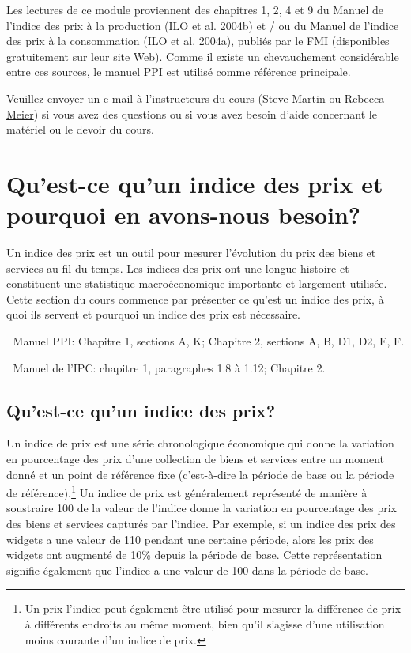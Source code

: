 \documentclass[]{article}
\begin{document}
Les lectures de ce module proviennent des chapitres 1, 2, 4 et 9 du Manuel de l'indice des prix à la production (ILO et al. 2004b) et / ou du Manuel de l'indice des prix à la consommation (ILO et al. 2004a), publiés par le FMI (disponibles gratuitement sur leur site Web). Comme il existe un chevauchement considérable entre ces sources, le manuel PPI est utilisé comme référence principale.

Veuillez envoyer un e-mail à l'instructeurs du cours (\href{mailto:steve.martin5@canada.ca}{Steve Martin} ou \href{mailto:rebecca.meier@canada.ca}{Rebecca Meier}) si vous avez des questions ou si vous avez besoin d'aide concernant le matériel ou le devoir du cours.

\hypertarget{quest-ce-quun-indice-des-prix-et-pourquoi-en-avons-nous-besoin}{%
\section{Qu'est-ce qu'un indice des prix et pourquoi en avons-nous besoin?}\label{quest-ce-quun-indice-des-prix-et-pourquoi-en-avons-nous-besoin}}

Un indice des prix est un outil pour mesurer l'évolution du prix des biens et services au fil du temps. Les indices des prix ont une longue histoire et constituent une statistique macroéconomique importante et largement utilisée. Cette section du cours commence par présenter ce qu'est un indice des prix, à quoi ils servent et pourquoi un indice des prix est nécessaire.

📖 Manuel PPI: Chapitre 1, sections A, K; Chapitre 2, sections A, B, D1, D2, E, F.

📖 Manuel de l'IPC: chapitre 1, paragraphes 1.8 à 1.12; Chapitre 2.

\hypertarget{quest-ce-quun-indice-des-prix}{%
\subsection{Qu'est-ce qu'un indice des prix?}\label{quest-ce-quun-indice-des-prix}}

Un indice de prix est une série chronologique économique qui donne la variation en pourcentage des prix d'une collection de biens et services entre un moment donné et un point de référence fixe (c'est-à-dire la période de base ou la période de référence).\footnote{Un prix l'indice peut également être utilisé pour mesurer la différence de prix à différents endroits au même moment, bien qu'il s'agisse d'une utilisation moins courante d'un indice de prix.} Un indice de prix est généralement représenté de manière à soustraire 100 de la valeur de l'indice donne la variation en pourcentage des prix des biens et services capturés par l'indice. Par exemple, si un indice des prix des widgets a une valeur de 110 pendant une certaine période, alors les prix des widgets ont augmenté de 10\% depuis la période de base. Cette représentation signifie également que l'indice a une valeur de 100 dans la période de base.
\end{document}
